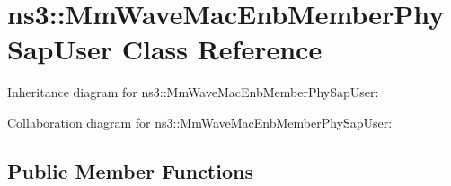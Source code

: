 \hypertarget{classns3_1_1MmWaveMacEnbMemberPhySapUser}{}\section{ns3\+:\+:Mm\+Wave\+Mac\+Enb\+Member\+Phy\+Sap\+User Class Reference}
\label{classns3_1_1MmWaveMacEnbMemberPhySapUser}


Inheritance diagram for ns3\+:\+:Mm\+Wave\+Mac\+Enb\+Member\+Phy\+Sap\+User\+:


Collaboration diagram for ns3\+:\+:Mm\+Wave\+Mac\+Enb\+Member\+Phy\+Sap\+User\+:
\subsection*{Public Member Functions}
